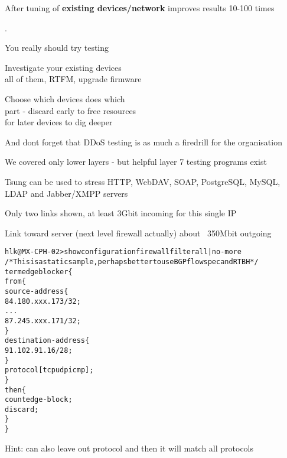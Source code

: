 \documentclass[Screen16to9,17pt]{foils}
\begin{document}
\vskip 1cm
\centerline{After tuning of {\bf existing devices/network} improves results 10-100 times}


.
\begin{list1}
\item You really should try testing
\item Investigate your existing devices\\
all of them, RTFM, upgrade firmware
\item Choose which devices does which\\
part - discard early to free resources\\
for later devices to dig deeper
\end{list1}

\vskip 2cm
\centerline{And dont forget that DDoS testing is as much a firedrill for the organisation}



\begin{list1}
\item We covered only lower layers - but helpful layer 7 testing programs exist
\item Tsung can be used to stress HTTP, WebDAV, SOAP, PostgreSQL, MySQL, LDAP and Jabber/XMPP servers 
\end{list1}



\centerline{Only two links shown, at least 3Gbit incoming for this single IP}

\centerline{Link toward server (next level firewall actually) about ~350Mbit outgoing}



\begin{alltt}\footnotesize
hlk@MX-CPH-02> show configuration firewall filter all | no-more
/* This is a static sample, perhaps better to use BGP flowspec and RTBH */
term edgeblocker \{
    from \{
        source-address \{
            84.180.xxx.173/32;
...
            87.245.xxx.171/32;
        \}
        destination-address \{
            91.102.91.16/28;
        \}
        protocol [ tcp udp icmp ];
    \}
    then \{
        count edge-block;
        discard;
    \}
\}
\end{alltt}
Hint: can also leave out protocol and then it will match all protocols
\end{document}
